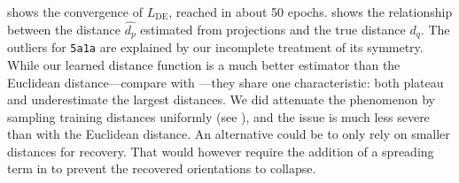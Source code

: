  shows the convergence of $L_\text{DE}$, reached in about 50 epochs.
 shows the relationship between the distance $\widehat{d_p}$ estimated from projections and the true distance $d_q$.
The outliers for \texttt{5a1a} are explained by our incomplete treatment of its symmetry.
While our learned distance function is a much better estimator than the Euclidean distance---compare  with ---they share one characteristic: both plateau and underestimate the largest distances.
We did attenuate the phenomenon by sampling training distances uniformly (see ), and the issue is much less severe than with the Euclidean distance.
An alternative could be to only rely on smaller distances for recovery.
That would however require the addition of a spreading term in  to prevent the recovered orientations to collapse.

